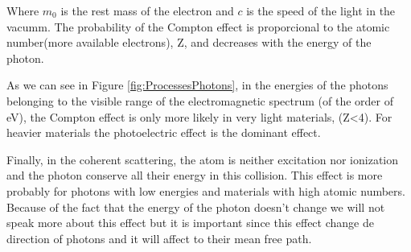 Where $m_0$ is the rest mass of the electron and $c$ is the speed of the light in the vacumm. The probability of the Compton effect is proporcional to the atomic number(more available electrons), Z,  and decreases with the energy of the photon. 

As we can see in Figure \ref{fig:ProcessesPhotons}, in the energies of the photons belonging to the visible range of the electromagnetic spectrum (of the order of eV), the Compton effect is only more likely in very light materials, (Z<4). For heavier materials the photoelectric effect is the dominant effect.

Finally, in the coherent scattering, the atom is neither excitation nor ionization and the photon conserve all their energy in this collision. This effect is more probably for photons with low energies and materials with high atomic numbers. Because of the fact that the energy of the photon doesn't change we will not speak more about this effect but it is important since this effect change de direction of photons and it will affect to their mean free path.